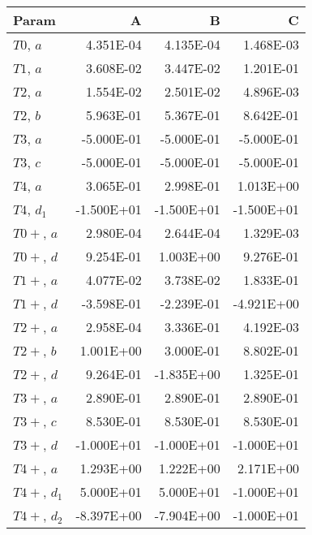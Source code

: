 \begin{tabular}{lrrr}
\toprule
 Param        &          A &          B &          C \\
\midrule
 $T0$, $a$    &  \num{4.351E-04} &  \num{4.135E-04} &  \num{1.468E-03} \\
 $T1$, $a$    &  \num{3.608E-02} &  \num{3.447E-02} &  \num{1.201E-01} \\
 $T2$, $a$    &  \num{1.554E-02} &  \num{2.501E-02} &  \num{4.896E-03} \\
 $T2$, $b$    &  \num{5.963E-01} &  \num{5.367E-01} &  \num{8.642E-01} \\
 $T3$, $a$    & \num{-5.000E-01} & \num{-5.000E-01} & \num{-5.000E-01} \\
 $T3$, $c$    & \num{-5.000E-01} & \num{-5.000E-01} & \num{-5.000E-01} \\
 $T4$, $a$    &  \num{3.065E-01} &  \num{2.998E-01} &  \num{1.013E+00} \\
 $T4$, $d_1$  & \num{-1.500E+01} & \num{-1.500E+01} & \num{-1.500E+01} \\
 $T0+$, $a$   &  \num{2.980E-04} &  \num{2.644E-04} &  \num{1.329E-03} \\
 $T0+$, $d$   &  \num{9.254E-01} &  \num{1.003E+00} &  \num{9.276E-01} \\
 $T1+$, $a$   &  \num{4.077E-02} &  \num{3.738E-02} &  \num{1.833E-01} \\
 $T1+$, $d$   & \num{-3.598E-01} & \num{-2.239E-01} & \num{-4.921E+00} \\
 $T2+$, $a$   &  \num{2.958E-04} &  \num{3.336E-01} &  \num{4.192E-03} \\
 $T2+$, $b$   &  \num{1.001E+00} &  \num{3.000E-01} &  \num{8.802E-01} \\
 $T2+$, $d$   &  \num{9.264E-01} & \num{-1.835E+00} &  \num{1.325E-01} \\
 $T3+$, $a$   &  \num{2.890E-01} &  \num{2.890E-01} &  \num{2.890E-01} \\
 $T3+$, $c$   &  \num{8.530E-01} &  \num{8.530E-01} &  \num{8.530E-01} \\
 $T3+$, $d$   & \num{-1.000E+01} & \num{-1.000E+01} & \num{-1.000E+01} \\
 $T4+$, $a$   &  \num{1.293E+00} &  \num{1.222E+00} &  \num{2.171E+00} \\
 $T4+$, $d_1$ &  \num{5.000E+01} &  \num{5.000E+01} & \num{-1.000E+01} \\
 $T4+$, $d_2$ & \num{-8.397E+00} & \num{-7.904E+00} & \num{-1.000E+01} \\
\bottomrule
\end{tabular}